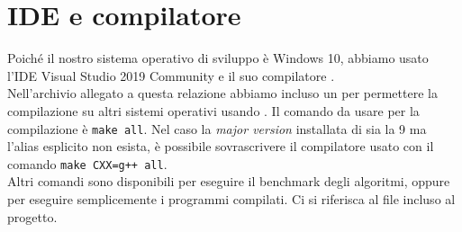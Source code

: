 \section{IDE e compilatore}
\label{cap:language-choice}

Poiché il nostro sistema operativo di sviluppo è Windows 10, abbiamo usato l'IDE Visual Studio 2019 Community e il suo compilatore . \\

\noindent Nell'archivio allegato a questa relazione abbiamo incluso un  per permettere la compilazione su altri sistemi operativi usando . Il comando da usare per la compilazione è \texttt{make all}. Nel caso la \textit{major version} installata di  sia la 9 ma l'alias esplicito  non esista, è possibile sovrascrivere il compilatore usato con il comando \texttt{make CXX=g++ all}. \\

\noindent Altri comandi sono disponibili per eseguire il benchmark degli algoritmi, oppure per eseguire semplicemente i programmi compilati. Ci si riferisca al file  incluso al progetto.
